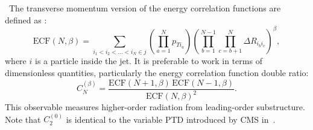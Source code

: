 ~The transverse momentum version of the energy correlation functions are defined as \cite{Larkoski:2013eya}:
%
\begin{equation}
\mathrm{ECF}(N,\beta) = \sum_{i_1 < i_2<\ldots<i_N \in j} \left(\prod_{a=1}^N p_{T i_a}\right)\left( \prod_{b=1}^{N-1} \prod_{c=b+1}^N \Delta R_{i_b i_c}\right)^\beta,
\end{equation}
%
where $i$ is a particle inside the jet. It is preferable to work in terms of dimensionless quantities, particularly the energy correlation function double ratio:
%
\begin{equation}
C_N^{(\beta)} = \frac{\mathrm{ECF}(N+1,\beta)\,\mathrm{ECF}(N-1,\beta)}{\mathrm{ECF}(N,\beta)^2}.
\end{equation}
%
This observable measures higher-order radiation from leading-order substructure. Note that $C_2^{(0)}$ is identical to the variable PTD introduced by CMS in~\cite{Chatrchyan:2012sn}. 

